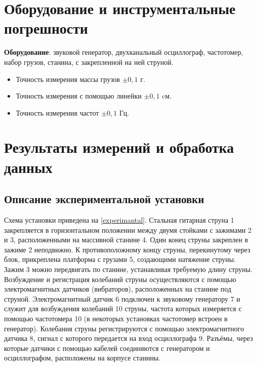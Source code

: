 \documentclass[
a4paper, %
12pt, %
]{article}
\begin{document}
	\newpage
	
	\section{Оборудование и инструментальные погрешности}
	\textbf{Оборудование}: звуковой генератор, двухканальный осциллограф, частотомер, набор грузов, станина, с закрепленной на ней струной.

	\begin{itemize}
		\item Точность измерения массы грузов $\pm 0,1$ г.
		\item Точность измерения с помощью линейки $\pm 0,1$ cм.
		\item Точность измерения частот $\pm 0,1$ Гц.
	\end{itemize}
	
	
	\section{Результаты измерений и обработка данных}
	
	\subsection{Описание экспериментальной установки}
	Схема установки приведена на \ref{experimantal}. Стальная гитарная струна 1 закрепляется в горизонтальном положении между двумя стойками с зажимами 2 и 3, расположенными на массивной станине 4. Один конец струны
	закреплен в зажиме 2 неподвижно. К противоположному концу струны, перекинутому через блок, прикреплена платформа с грузами 5, создающими натяжение струны. Зажим 3 можно передвигать по станине, устанавливая требуемую длину струны. Возбуждение и регистрация колебаний струны осуществляются с помощью электромагнитных датчиков (вибраторов), расположенных на станине под струной. Электромагнитный датчик 6 подключен к звуковому генератору 7 и служит для возбуждения колебаний 10 струны, частота которых измеряется с помощью частотомера 10 (в некоторых установках частотомер встроен в генератор). Колебания струны регистрируются с помощью электромагнитного датчика 8, сигнал с которого передается на вход осциллографа 9. Разъёмы, через которые датчики с помощью кабелей соединяются с генератором и осциллографом, расположены на корпусе станины.
	
\end{document}
